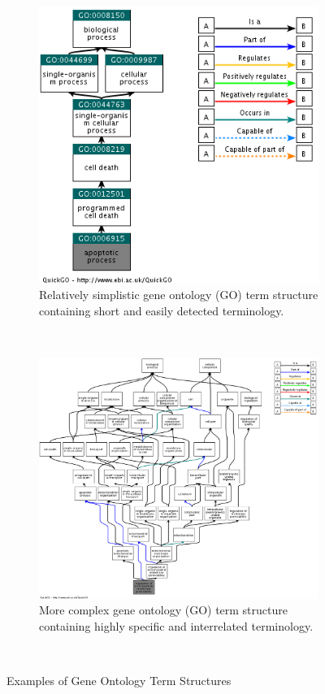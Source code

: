\documentclass[twoside]{article}
\begin{document}
\begin{figure}
    \centering
    \begin{subfigure}[b]{0.45\textwidth}
        \includegraphics[width=\textwidth]{apoptotic.png}
        \caption{Relatively simplistic gene ontology (GO) term structure containing short and easily detected terminology.}
        \label{fig:simple}
    \end{subfigure}
    ~ 
    \begin{subfigure}[b]{0.45\textwidth}
        \includegraphics[width=\textwidth]{fig2.png}
        \caption{More complex gene ontology (GO) term structure containing highly specific and interrelated terminology.}
        \label{fig:complex}
    \end{subfigure}
    ~ 
    \caption{Examples of Gene Ontology Term Structures}\label{fig:animals}
\end{figure}
\end{document}
